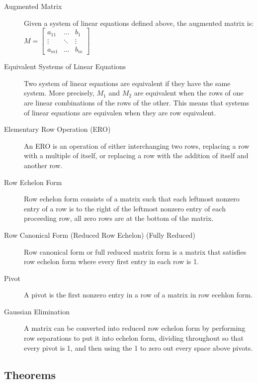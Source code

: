     \begin{description}
      \item[Augmented Matrix]  Given a system of linear equations defined above, the augmented matrix is:\\
      $M = \left[\begin{array}{cc|c}
        a_{11} & \ldots & b_1 \\
        \vdots & \ddots & \vdots \\
        a_{m1} & \ldots & b_m 
      \end{array}\right]$

      \item[Equivalent Systems of Linear Equations] Two system of linear equations are equivalent if they have the same system.
      More precisely, $M_1$ and $M_2$ are equivalent when the rows of one are linear combinations of the rows of the other. 
      This means that systems of linear equations are equivalen when they are row equivalent.

      \item[Elementary Row Operation (ERO)] An ERO is an operation of either interchanging two rows, replacing a row with a multiple of itself, or replacing a row with the addition of itself and another row.

      \item[Row Echelon Form] Row echelon form consists of a matrix such that each leftmost nonzero entry of a row is to the right of the leftmost nonzero entry of each proceeding row, all zero rows are at the bottom of the matrix.

      \item[Row Canonical Form (Reduced Row Echelon) (Fully Reduced)] Row canonical form or full reduced matrix form is a matrix that satisfies row echelon form where every first entry in each row is 1.

      \item[Pivot] A pivot is the first nonzero entry in a row of a matrix in row ecehlon form.

      \item[Gaussian Elimination] A matrix can be converted into reduced row echelon form by performing row separations to put it into echelon form, dividing throughout so that every pivot is 1, and then using the 1 to zero out every space above pivots. 

    \end{description}
  
  \subsection{Theorems}
  
